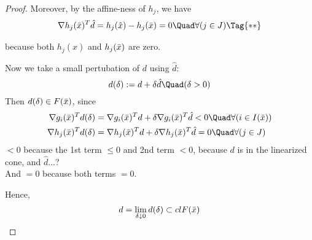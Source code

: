 \begin{proof}
  Moreover, by the affine-ness of $h_j$, we have
  \begin{align*}
    \nabla h_j(\bx)^T\hat d = h_j(\hat x)-h_j(\bx)=0\Quad\forall(j\in J)\Tag{**}
  \end{align*}

  because both $h_j(\hat x)$ and $h_j(\bar x)$ are zero.

  Now we take a small pertubation of $d$ using $\hat d$:
  $$
    d(\delta):= d + \delta\hat d\Quad(\delta>0)
  $$
  Then $d(\delta)\in F(\bar x)$, since
  \begin{align*}
    \nabla g_i(\bx)^Td(\delta) & =\nabla g_i(\bx)^Td + \delta\nabla g_i(\bx)^T\hat d<0 \Quad\forall(i\in\Act) \\
    \nabla h_j(\bx)^Td(\delta) & =\nabla h_j(\bx)^Td + \delta\nabla h_j(\bx)^T\hat d=0 \Quad\forall(j\in J)
  \end{align*}
  $<0$ because the 1st term $\leq0$ and 2nd term $<0$, because $d$ is
  in the linearized cone, and $\hat d$...? \\
  And $=0$ because both terms $=0$.

  Hence,
  $$
    d=\lim_{\delta\downarrow0}d(\delta) \subset clF(\bar x)
  $$
\end{proof}
